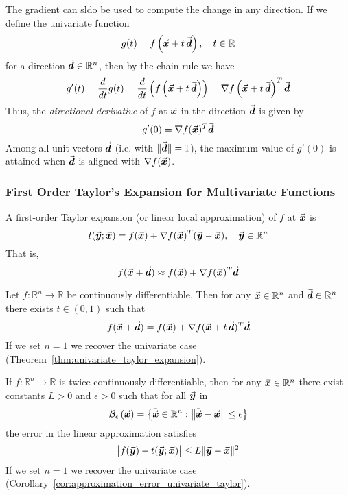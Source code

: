 
The gradient can sldo be used to compute the change in any direction. If we define the univariate function
\[
g(t)=f\left(\vect{x}+t\,\vect{d}\right), \quad t\in\mathbb{R}%
\]
for a direction \(\vec{\boldsymbol{d}}\in\mathbb{R}^{n}\), then by the chain rule we have
\[
g'(t) = \frac{d}{dt}g(t) = \frac{d}{dt}\left(f\left(\vec{\boldsymbol{x}}+t\,\vec{\boldsymbol{d}}\right)\right) = \nabla f\left(\vec{\boldsymbol{x}}+t\,\vec{\boldsymbol{d}}\right)^{T}\vec{\boldsymbol{d}}
\]
Thus, the \hypertarget{directional_derivative}{\emph{directional derivative}} of \(f\) at \(\vec{\boldsymbol{x}}\) in the direction \(\vec{\boldsymbol{d}}\) is given by
\[
g'(0)=\nabla f(\vec{\boldsymbol{x}})^{T}\vec{\boldsymbol{d}}
\]
Among all unit vectors \(\vec{\boldsymbol{d}}\) (i.e. with \(\|\vec{\boldsymbol{d}}\|=1\)), the maximum value of \(g'(0)\) is attained when \(\vec{\boldsymbol{d}}\) is aligned with \(\nabla f(\vec{\boldsymbol{x}})\).

\subsubsection{First Order Taylor's Expansion for Multivariate Functions}
A first-order Taylor expansion (or linear local approximation) of \(f\) at \(\vec{\boldsymbol{x}}\) is
\[
t(\vec{\boldsymbol{y}};\vec{\boldsymbol{x}})=f(\vec{\boldsymbol{x}})+\nabla f(\vec{\boldsymbol{x}})^{T}(\vec{\boldsymbol{y}}-\vec{\boldsymbol{x}}),\quad \vec{\boldsymbol{y}}\in\mathbb{R}^{n}
\]
That is,
\[
f(\vec{\boldsymbol{x}}+\vec{\boldsymbol{d}})\approx f(\vec{\boldsymbol{x}})+\nabla f(\vec{\boldsymbol{x}})^{T}\vec{\boldsymbol{d}}
\]

\begin{theorem}
\label{thm:taylor_multivariate_first_order}
Let \(f:\mathbb{R}^{n}\to\mathbb{R}\) be continuously differentiable. Then for any \(\vec{\boldsymbol{x}}\in\mathbb{R}^{n}\) and \(\vec{\boldsymbol{d}}\in\mathbb{R}^{n}\) there exists \(t\in(0,1)\) such that
\[
f(\vec{\boldsymbol{x}}+\vec{\boldsymbol{d}})=f(\vec{\boldsymbol{x}})+\nabla f(\vec{\boldsymbol{x}}+t\,\vec{\boldsymbol{d}})^{T}\vec{\boldsymbol{d}}
\]
If we set \(n=1\) we recover the univariate case (Theorem~\ref{thm:univariate_taylor_expansion}).
\end{theorem}

\begin{corollary}
\label{cor:taylor_error_multivariate_first_order}
If \(f:\mathbb{R}^{n}\to\mathbb{R}\) is twice continuously differentiable, then for any \(\vec{\boldsymbol{x}}\in\mathbb{R}^{n}\) there exist constants \(L>0\) and \(\epsilon>0\) such that for all \(\vec{\boldsymbol{y}}\) in
\[
\mathcal{B}_{\epsilon}\left(\vec{\boldsymbol{x}}\right)=\left\{\bar{\vec{\boldsymbol{x}}}\in\mathbb{R}^{n}:\left\|\bar{\vec{\boldsymbol{x}}}-\vec{\boldsymbol{x}}\right\|\le\epsilon\right\}
\]
the error in the linear approximation satisfies
\[
\bigl|f(\vec{\boldsymbol{y}})-t(\vec{\boldsymbol{y}};\vec{\boldsymbol{x}})\bigr|\le L\|\vec{\boldsymbol{y}}-\vec{\boldsymbol{x}}\|^{2}
\]
If we set \(n=1\) we recover the univariate case (Corollary~\ref{cor:approximation_error_univariate_taylor}).
\end{corollary}


